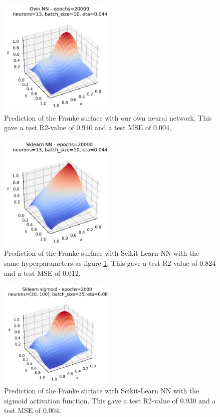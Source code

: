 \documentclass[12pt,a4paper]{article}
\begin{document}
    \begin{figure}[H]
        \centering
        \includegraphics[width=0.5\textwidth]{figures/own_nn_surface1.png}
        \caption{Prediction of the Franke surface with our own neural network. This gave a test R2-value of 0.940 and a test MSE of 0.004.}
        \label{fig:own_nn_surface}
    \end{figure}

    \begin{figure}[H]
        \centering
        \includegraphics[width=0.5\textwidth]{figures/sklearn_nn_surface1.png}
        \caption{Prediction of the Franke surface with Scikit-Learn NN with the same hyperparameters as figure \ref{fig:own_nn_surface}. This gave a test R2-value of 0.824 and a test MSE of 0.012.}
        \label{fig:nn_sklearn_surf1}
    \end{figure}
    
    \begin{figure}[H]
        \centering
        \includegraphics[width=0.5\textwidth]{figures/sklearn_sigmoid.png}
        \caption{Prediction of the Franke surface with Scikit-Learn NN with the sigmoid activation function. This gave a test R2-value of 0.930 and a test MSE of 0.004.}
        \label{fig:nn_sklearn_surf2}
    \end{figure}
    
\end{document}
